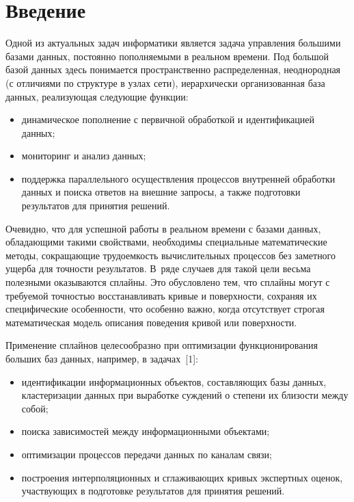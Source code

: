 


      \thispagestyle{headings}

      \begin{multicols}{2}

            \label{st\stat}        

\section{Введение}

  Одной из актуальных задач информатики является задача управления 
большими базами данных, постоянно пополняемыми в реальном времени. Под 
большой базой данных здесь понимается пространственно распределенная, 
неоднородная (с отличиями по структуре в узлах сети), иерархически 
организованная база данных, реализующая следующие функции: 
  \begin{itemize}
  \item  динамическое пополнение с первичной обработкой и идентификацией 
данных;
  \item мониторинг и анализ данных;
  \item поддержка параллельного осуществления процессов внутренней 
обработки данных и поиска ответов на внешние запросы, а также подготовки 
результатов для принятия решений.
  \end{itemize}
  
  Очевидно, что для успешной работы в реальном времени с базами данных, 
обладающими такими свойствами, необходимы специальные математические 
методы, сокращающие трудоемкость вы\-чис\-ли\-тель\-ных процессов без заметного 
ущерба для точности результатов. В~ряде случаев для такой цели весьма 
полезными оказываются сплайны. Это обусловлено тем, что сплайны могут с 
требуемой точностью восстанавливать кривые и поверхности, сохраняя их 
специфические особенности, что особенно важно, когда отсутствует строгая 
математическая модель описания поведения кривой или поверхности. 
  
  Применение сплайнов целесообразно при оптимизации функционирования 
больших баз данных, например, в задачах~[1]:\\[-14pt] 
  \begin{itemize}
  \item идентификации информационных объектов, составляющих базы 
данных, кластеризации данных при выработке суждений о степени их близости 
между собой;\\[-14pt] 
  \item поиска зависимостей между информационными объектами;
  \item оптимизации процессов передачи данных по каналам связи;
  \item построения интерполяционных и сгла\-жи\-ва\-ющих кривых экспертных 
оценок, участ\-ву\-ющих в подготовке результатов для принятия решений.
  \end{itemize}
  

\end{multicols}
